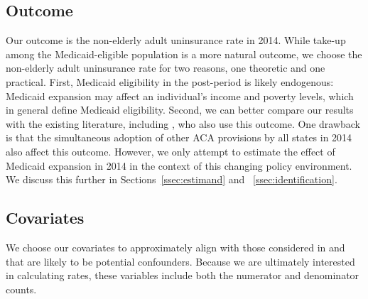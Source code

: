 \documentclass[aoas]{imsart}
\theoremstyle{plain}
\theoremstyle{remark}
\begin{document}
\subsection{Outcome}

Our outcome is the non-elderly adult uninsurance rate in 2014. While take-up among the Medicaid-eligible population is a more natural outcome, we choose the non-elderly adult uninsurance rate for two reasons, one theoretic and one practical. First, Medicaid eligibility in the post-period is likely endogenous: Medicaid expansion may affect an individual's income and poverty levels, which in general define Medicaid eligibility. Second, we can better compare our results with the existing literature, including \cite{courtemanche2017early}, who also use this outcome. One drawback is that the simultaneous adoption of other ACA provisions by all states in 2014 also affect this outcome. However, we only attempt to estimate the effect of Medicaid expansion in 2014 in the context of this changing policy environment. We discuss this further in Sections~\ref{ssec:estimand} and ~\ref{ssec:identification}. 

\subsection{Covariates}

We choose our covariates to approximately align with those considered in \cite{courtemanche2017early} and that are likely to be potential confounders. Because we are ultimately interested in calculating rates, these variables include both the numerator and denominator counts. 
\end{document}
